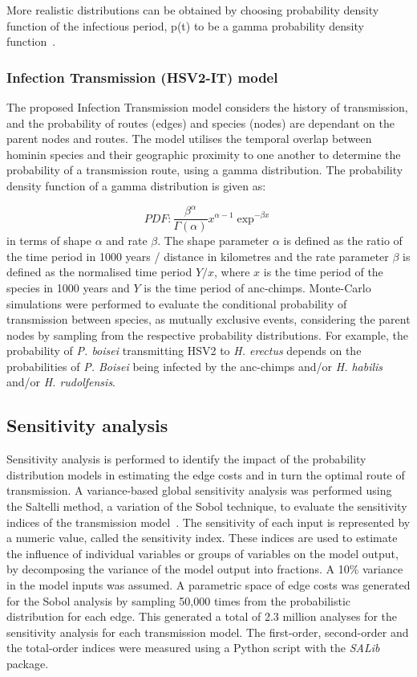 \documentclass[fleqn,10pt]{wlscirep}
\begin{document}
More realistic distributions can be obtained by choosing  probability density function of the infectious period,  p(t) to be a gamma probability density function~\citep{Blythe1988,Lloyd2001}.

\subsubsection*{Infection Transmission (HSV2-IT) model}
The proposed Infection Transmission model considers the history of transmission, and the probability of routes (edges) and species (nodes) are dependant on the parent nodes and routes. The model utilises the temporal overlap between hominin species and their geographic proximity to one another to determine the probability of a transmission route, using a gamma distribution.  The probability density function of a gamma distribution is given as:

\begin{equation}
PDF:\frac{\beta^\alpha}{\Gamma(\alpha)}x^{\alpha - 1} \exp^{-\beta x}
\end{equation}
in terms of shape $\alpha$ and rate $\beta$. The shape parameter $\alpha$ is defined as the ratio of the time period in 1000 years / distance in kilometres and the rate parameter $\beta$ is defined as the normalised time period $Y / x$, where $x$ is the time period of the species in 1000 years and $Y$ is the time period of anc-chimps. Monte-Carlo simulations were performed to evaluate the conditional probability of transmission between species, as mutually exclusive events, considering the parent nodes by sampling from the respective probability distributions. For example, the probability of \textit{P. boisei} transmitting HSV2 to \textit{H. erectus} depends on the probabilities of \textit{P. Boisei} being infected by the anc-chimps and/or \textit{H. habilis} and/or \textit{H. rudolfensis}.

\subsection*{Sensitivity analysis}
Sensitivity analysis is performed to identify the impact of the probability distribution models in estimating the edge costs and in turn the optimal route of transmission. A variance-based global sensitivity analysis was performed using the Saltelli method, a variation of the Sobol technique, to evaluate the sensitivity indices of the transmission model~\citep{Sobol2001,Saltelli2010}. The sensitivity of each input is represented by a numeric value, called the sensitivity index. These indices are used to estimate the influence of individual variables or groups of variables on the model output, by decomposing the variance of the model output into fractions. A 10\% variance in the model inputs was assumed. A parametric space of edge costs was generated for the Sobol analysis by sampling 50,000 times from the probabilistic distribution for each edge. This generated a total of 2.3 million analyses for the sensitivity analysis for each transmission model. The first-order, second-order and the total-order indices were measured using a Python script with the \textit{SALib} package. 
\end{document}
